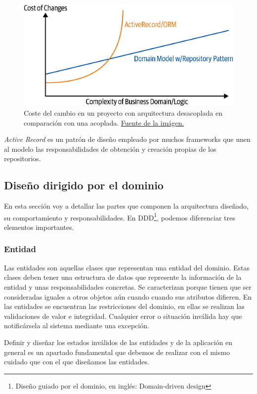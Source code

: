 \FloatBarrier
\begin{figure}[h]
	\centering	
	\includegraphics[width=\textwidth]{doc/logos/imgs/costeEvolucion.png}
    \caption{Coste del cambio en un proyecto con arquitectura desacoplada en comparación con una acoplada. \href{https://www.cosmicpython.com/book/images/apwp_0205.png}{Fuente de la imágen.}}
    \label{fig:coste-repo-pattern}
\end{figure}
\FloatBarrier
\textit{Active Record} es un 
patrón de diseño empleado por muchos frameworks que unen al modelo las responsabilidades de 
obtención y creación propias de los repositorios.

\subsection{Diseño dirigido por el dominio}
En esta sección voy a detallar las partes que componen la arquitectura diseñado, su
comportamiento y responsabilidades. En DDD\footnote{Diseño guiado por el dominio, en
inglés: Domain-driven design}, podemos diferenciar tres elementos importantes.

\subsubsection{Entidad}
Las entidades son aquellas clases que representan una entidad del dominio. Estas clases
deben tener una estructura de datos que represente la información de la entidad y unas
responsabilidades concretas. Se caracterizan porque tienen que ser consideradas iguales a
otros objetos aún cuando cuando sus atributos difieren. En las entidades se encuentran las
restricciones del dominio, en ellas se realizan las validaciones de valor e integridad.
Cualquier error o situación inválida hay que notificársela al sistema mediante una
excepción. 

Definir y diseñar los estados inválidos de las entidades y de la aplicación en general es
un apartado fundamental que debemos de realizar con el mismo cuidado que con el que
diseñamos las entidades.


